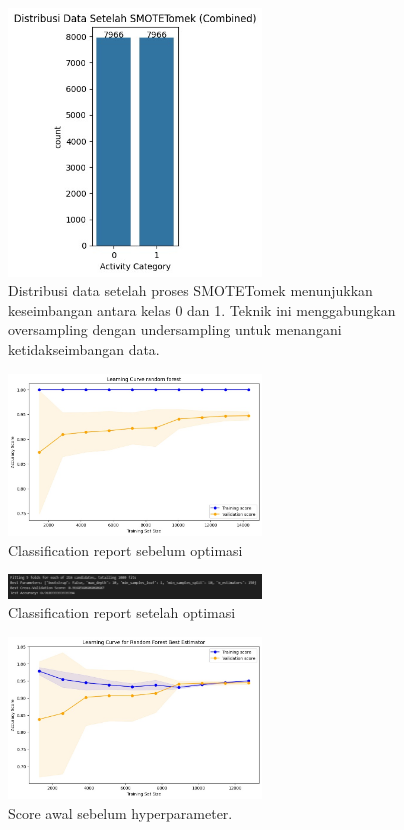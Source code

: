 \documentclass[journal,article,submit,pdftex,moreauthors]{Definitions/mdpi}
\begin{document}
\begin{figure}[H]
    \centering
    \includegraphics[width=0.6\textwidth]{Definitions/images/2.jpeg}
    \caption{Distribusi data setelah proses SMOTETomek menunjukkan keseimbangan antara kelas 0 dan 1. Teknik ini menggabungkan oversampling dengan undersampling untuk menangani ketidakseimbangan data.}
    \label{fig:distribusi_resampling}
\end{figure}

\begin{figure}[H]
    \centering
    \includegraphics[width=0.6\textwidth]{Definitions/images/3.jpeg}
    \caption{Classification report sebelum optimasi}
\end{figure}

\begin{figure}[H]
    \centering
    \includegraphics[width=0.6\textwidth]{Definitions/images/6.jpeg}
    \caption{Classification report setelah optimasi}
\end{figure}

\begin{figure}[H]
    \centering
    \includegraphics[width=0.6\textwidth]{Definitions/images/4.jpeg}
    \caption{Score awal sebelum hyperparameter.}
\end{figure}
\end{document}
